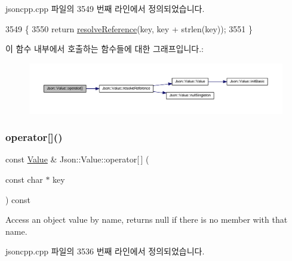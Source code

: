 jsoncpp.\+cpp 파일의 3549 번째 라인에서 정의되었습니다.


\begin{DoxyCode}
3549                                         \{
3550   \textcolor{keywordflow}{return} \hyperlink{class_json_1_1_value_a9ff9cdae2c8f4155bab603d750b0b3f1}{resolveReference}(key, key + strlen(key));
3551 \}
\end{DoxyCode}
이 함수 내부에서 호출하는 함수들에 대한 그래프입니다.\+:\nopagebreak
\begin{figure}[H]
\begin{center}
\leavevmode
\includegraphics[width=350pt]{class_json_1_1_value_acb912f4ec40a25ea6eb387730885f3d9_cgraph}
\end{center}
\end{figure}
\mbox{\label{class_json_1_1_value_a1b0498b7b2a520a68137f682d91abdd5}} 
\subsubsection{\texorpdfstring{operator[]()}{operator[]()}\hspace{0.1cm}{\footnotesize\ttfamily [6/9]}}
{\footnotesize\ttfamily const \hyperlink{class_json_1_1_value}{Value} \& Json\+::\+Value\+::operator\mbox{[}$\,$\mbox{]} (\begin{DoxyParamCaption}\item[{const char $\ast$}]{key }\end{DoxyParamCaption}) const}

Access an object value by name, returns null if there is no member with that name. 

jsoncpp.\+cpp 파일의 3536 번째 라인에서 정의되었습니다.


